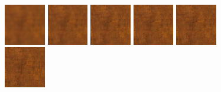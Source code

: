 \begin{figure}[!h]
\centering
\includegraphics[width=0.16\textwidth]{img/ch6/copper/train1.png}
\includegraphics[width=0.16\textwidth]{img/ch6/copper/train2.png}
\includegraphics[width=0.16\textwidth]{img/ch6/copper/train3.png}
\includegraphics[width=0.16\textwidth]{img/ch6/copper/train4.png}
\includegraphics[width=0.16\textwidth]{img/ch6/copper/train5.png}
\includegraphics[width=0.16\textwidth]{img/ch6/copper/train6.png}


\end{figure}
